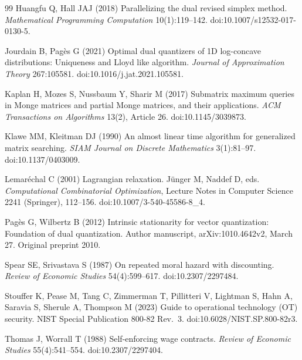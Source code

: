 \begin{thebibliography}{99}
Huangfu Q, Hall JAJ (2018) Parallelizing the dual revised simplex method. \emph{Mathematical Programming Computation} 10(1):119--142. doi:10.1007/s12532-017-0130-5.

Jourdain B, Pag\`es G (2021) Optimal dual quantizers of 1D log-concave distributions: Uniqueness and Lloyd like algorithm. \emph{Journal of Approximation Theory} 267:105581. doi:10.1016/j.jat.2021.105581.

Kaplan H, Mozes S, Nussbaum Y, Sharir M (2017) Submatrix maximum queries in Monge matrices and partial Monge matrices, and their applications. \emph{ACM Transactions on Algorithms} 13(2), Article 26. doi:10.1145/3039873.

Klawe MM, Kleitman DJ (1990) An almost linear time algorithm for generalized matrix searching. \emph{SIAM Journal on Discrete Mathematics} 3(1):81--97. doi:10.1137/0403009.

Lemar\'echal C (2001) Lagrangian relaxation. J\"unger M, Naddef D, eds. \emph{Computational Combinatorial Optimization}, Lecture Notes in Computer Science 2241 (Springer), 112--156. doi:10.1007/3-540-45586-8\_4.

Pag\`es G, Wilbertz B (2012) Intrinsic stationarity for vector quantization: Foundation of dual quantization. Author manuscript, arXiv:1010.4642v2, March 27. Original preprint 2010.

Spear SE, Srivastava S (1987) On repeated moral hazard with discounting. \emph{Review of Economic Studies} 54(4):599--617. doi:10.2307/2297484.

Stouffer K, Pease M, Tang C, Zimmerman T, Pillitteri V, Lightman S, Hahn A, Saravia S, Sherule A, Thompson M (2023) Guide to operational technology (OT) security. NIST Special Publication 800-82 Rev.~3. doi:10.6028/NIST.SP.800-82r3.

Thomas J, Worrall T (1988) Self-enforcing wage contracts. \emph{Review of Economic Studies} 55(4):541--554. doi:10.2307/2297404.


\end{thebibliography}
